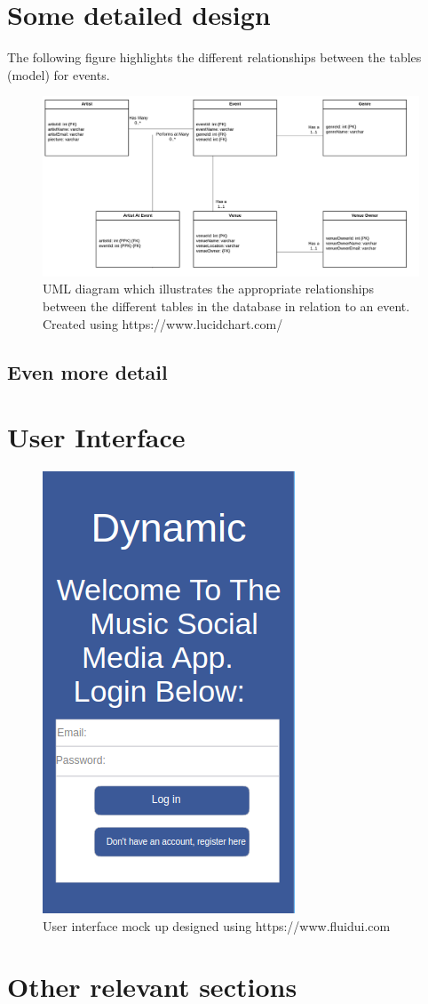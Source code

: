 \section{Some detailed design}
The following figure highlights the different relationships between the tables (model) for events.
\begin{figure}[H]
\includegraphics[width=\textwidth,height=\textheight,keepaspectratio]{images/events}
\caption{UML diagram which illustrates the appropriate relationships between the different tables in the database in relation to an event. Created using https://www.lucidchart.com/}

\end{figure}
\subsection{Even more detail}

\section{User Interface}
\begin{figure}[H]
\center
\includegraphics[scale=0.5]{images/ui1}
\caption{User interface mock up designed using https://www.fluidui.com}
\end{figure}

\section{Other relevant sections}
